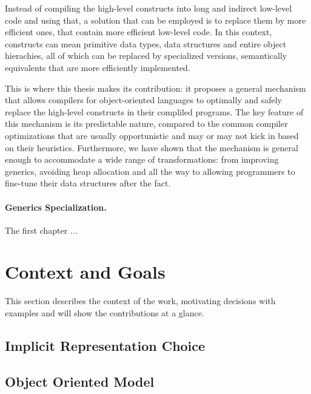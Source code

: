 Instead of compiling the high-level constructs into long and indirect low-level code and using that, a solution that can be employed is to replace them by more efficient ones, that contain more efficient low-level code. In this context, constructs can mean primitive data types, data structures and entire object hierachies, all of which can be replaced by specialized versions, semantically equivalents that are more efficiently implemented.

This is where this thesis makes its contribution: it proposes a general mechanism that allows compilers for object-oriented languages to optimally and safely replace the high-level constructs in their compliled programs. The key feature of this mechanism is its predictable nature, compared to the common compiler optimizations that are usually opportunistic and may or may not kick in based on their heuristics. Furthermore, we have shown that the mechanism is general enough to accommodate a wide range of transformations: from improving generics, avoiding heap allocation and all the way to allowing programmers to fine-tune their data structures after the fact.



\paragraph*{Generics Specialization.} The first chapter ...


\cite{st-amour-opt-coaching}

\section{Context and Goals}

This section describes the context of the work, motivating decisions with examples and will show the contributions at a glance.

\subsection{Implicit Representation Choice}


\subsection{Object Oriented Model}


